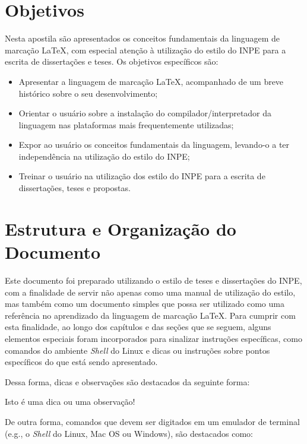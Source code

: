 \section{Objetivos}
\label{sec:objetivos}

Nesta apostila são apresentados os conceitos fundamentais da linguagem de marcação \LaTeX{}, com especial atenção à utilização do estilo do INPE para a escrita de dissertações e teses. Os objetivos específicos são:

\begin{itemize}
    \item Apresentar a linguagem de marcação \LaTeX{}, acompanhado de um breve histórico sobre o seu desenvolvimento;
    \item Orientar o usuário sobre a instalação do compilador/interpretador da linguagem nas plataformas mais frequentemente utilizadas;
    \item Expor ao usuário os conceitos fundamentais da linguagem, levando-o a ter independência na utilização do estilo do INPE;
    \item Treinar o usuário na utilização dos estilo do INPE para a escrita de dissertações, teses e propostas.
\end{itemize}

\section{Estrutura e Organização do Documento}
\label{sec:estrutura}

Este documento foi preparado utilizando o estilo de teses e dissertações do INPE, com a finalidade de servir não apenas como uma manual de utilização do estilo, mas também como um documento simples que possa ser utilizado como uma referência no aprendizado da linguagem de marcação \LaTeX{}. Para cumprir com esta finalidade, ao longo dos capítulos e das seções que se seguem, alguns elementos especiais foram incorporados para sinalizar instruções específicas, como comandos do ambiente \textit{Shell} do Linux e dicas ou instruções sobre pontos específicos do que está sendo apresentado. 

Dessa forma, dicas e observações são destacados da seguinte forma:

\begin{marker}
Isto é uma dica ou uma observação!
\end{marker}

De outra forma, comandos que devem ser digitados em um emulador de terminal (e.g., o \textit{Shell} do Linux, Mac OS ou Windows), são destacados como:

